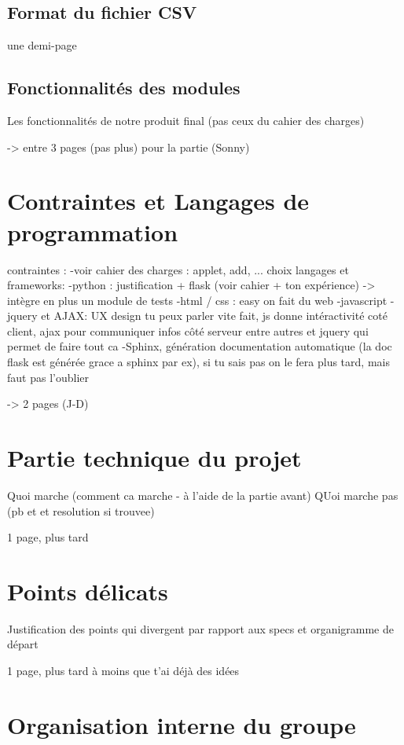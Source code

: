 		\subsection{Format du fichier CSV}
			une demi-page
		\subsection{Fonctionnalités des modules}
			Les fonctionnalités de notre produit final (pas ceux du cahier des charges)
		
		-> entre 3 pages (pas plus) pour la partie (Sonny)
		
	\section{Contraintes et Langages de programmation}
		contraintes :
			-voir cahier des charges : applet, add, ...
		choix langages et frameworks:
			-python : justification + flask (voir cahier + ton expérience) -> intègre en plus un module de tests
			-html / css : easy on fait du web
			-javascript - jquery et AJAX: UX design tu peux parler vite fait, js donne intéractivité coté client, ajax pour communiquer infos côté serveur entre autres et jquery qui permet de faire tout ca
			-Sphinx, génération documentation automatique (la doc flask est générée grace a sphinx par ex), si tu sais pas on le fera plus tard, mais faut pas l'oublier
			
		-> 2 pages (J-D)
		
	\section{Partie technique du projet}
		Quoi marche (comment ca marche - à l'aide de la partie avant)
		QUoi marche pas (pb et et resolution si trouvee)
		
		1 page, plus tard
		
	\section{Points délicats}
		
		Justification des points qui divergent par rapport aux specs et organigramme de départ
		
		1 page, plus tard à moins que t'ai déjà des idées
				
	\section{Organisation interne du groupe}
		
